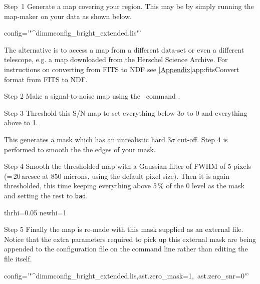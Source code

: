 \begin{aligndesc}
\item[Step~1] Generate a map covering your region. This may be by
  simply running the map-maker on your data as shown below.
\begin{terminalv}
          config='"^dimmconfig_bright_extended.lis"'
\end{terminalv}
The alternative is to access a map from a different data-set or even a
different telescope, e.g. a map downloaded from the Herschel Science
Archive. For instructions on converting from FITS to NDF see
\cref{Appendix}{app:fits}{Convert format from FITS to NDF}.\\

\item[Step 2] Make a signal-to-noise map using the \Kappa\ command
  \makesnr.
\begin{terminalv}
\end{terminalv}

\item[Step 3] Threshold this S/N map to set everything below
  3$\sigma$ to 0 and everything above to 1.
\begin{terminalv}
\end{terminalv}
This generates a mask which has an unrealistic hard 3$\sigma$
cut-off. Step 4 is performed to smooth the the edges of your mask.

\item[Step 4] Smooth the thresholded map with a Gaussian filter
  of FWHM of 5 pixels (=\,20\,arcsec at 850 microns, using the default pixel size).
  Then it is again thresholded,
  this time keeping everything above 5\,\% of the 0 level as the mask
  and setting the rest to \texttt{bad}.
\begin{terminalv}
  thrhi=0.05 newhi=1
\end{terminalv}

\item[Step 5] Finally the map is re-made with this mask supplied as an
  external file. Notice that the extra parameters required to pick up
  this external mask are being appended to the configuration file on
  the command line rather than editing the file itself.
\begin{terminalv}
          config='"^dimmconfig_bright_extended.lis,ast.zero_mask=1,\
                   ast.zero_snr=0"'
\end{terminalv}

\end{aligndesc}

